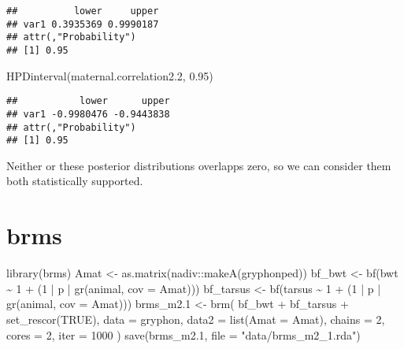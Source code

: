 \documentclass[
  12pt,
]{book}
\newenvironment{Shaded}{\begin{snugshade}}{\end{snugshade}}
\newcommand{\AttributeTok}[1]{\textcolor[rgb]{0.77,0.63,0.00}{#1}}
\newcommand{\ConstantTok}[1]{\textcolor[rgb]{0.00,0.00,0.00}{#1}}
\newcommand{\DecValTok}[1]{\textcolor[rgb]{0.00,0.00,0.81}{#1}}
\newcommand{\FloatTok}[1]{\textcolor[rgb]{0.00,0.00,0.81}{#1}}
\newcommand{\FunctionTok}[1]{\textcolor[rgb]{0.00,0.00,0.00}{#1}}
\newcommand{\NormalTok}[1]{#1}
\newcommand{\OtherTok}[1]{\textcolor[rgb]{0.56,0.35,0.01}{#1}}
\newcommand{\SpecialCharTok}[1]{\textcolor[rgb]{0.00,0.00,0.00}{#1}}
\newcommand{\StringTok}[1]{\textcolor[rgb]{0.31,0.60,0.02}{#1}}
\begin{document}
\begin{verbatim}
##          lower     upper
## var1 0.3935369 0.9990187
## attr(,"Probability")
## [1] 0.95
\end{verbatim}

\begin{Shaded}
\begin{Highlighting}[]
\FunctionTok{HPDinterval}\NormalTok{(maternal.correlation2}\FloatTok{.2}\NormalTok{, }\FloatTok{0.95}\NormalTok{)}
\end{Highlighting}
\end{Shaded}

\begin{verbatim}
##           lower      upper
## var1 -0.9980476 -0.9443838
## attr(,"Probability")
## [1] 0.95
\end{verbatim}

Neither or these posterior distributions overlapps zero, so we can consider them both statistically supported.

\hypertarget{brms-2}{%
\section{brms}\label{brms-2}}

\begin{Shaded}
\begin{Highlighting}[]
\FunctionTok{library}\NormalTok{(brms)}
\NormalTok{Amat }\OtherTok{\textless{}{-}} \FunctionTok{as.matrix}\NormalTok{(nadiv}\SpecialCharTok{::}\FunctionTok{makeA}\NormalTok{(gryphonped))}
\NormalTok{bf\_bwt }\OtherTok{\textless{}{-}} \FunctionTok{bf}\NormalTok{(bwt }\SpecialCharTok{\textasciitilde{}} \DecValTok{1} \SpecialCharTok{+}\NormalTok{ (}\DecValTok{1} \SpecialCharTok{|}\NormalTok{ p }\SpecialCharTok{|} \FunctionTok{gr}\NormalTok{(animal, }\AttributeTok{cov =}\NormalTok{ Amat)))}
\NormalTok{bf\_tarsus }\OtherTok{\textless{}{-}} \FunctionTok{bf}\NormalTok{(tarsus }\SpecialCharTok{\textasciitilde{}} \DecValTok{1} \SpecialCharTok{+}\NormalTok{ (}\DecValTok{1} \SpecialCharTok{|}\NormalTok{ p }\SpecialCharTok{|} \FunctionTok{gr}\NormalTok{(animal, }\AttributeTok{cov =}\NormalTok{ Amat)))}
\NormalTok{brms\_m2}\FloatTok{.1} \OtherTok{\textless{}{-}} \FunctionTok{brm}\NormalTok{(}
\NormalTok{  bf\_bwt }\SpecialCharTok{+}\NormalTok{ bf\_tarsus }\SpecialCharTok{+} \FunctionTok{set\_rescor}\NormalTok{(}\ConstantTok{TRUE}\NormalTok{),}
  \AttributeTok{data =}\NormalTok{ gryphon,}
  \AttributeTok{data2 =} \FunctionTok{list}\NormalTok{(}\AttributeTok{Amat =}\NormalTok{ Amat),}
  \AttributeTok{chains =} \DecValTok{2}\NormalTok{, }\AttributeTok{cores =} \DecValTok{2}\NormalTok{, }\AttributeTok{iter =} \DecValTok{1000}
\NormalTok{)}
\FunctionTok{save}\NormalTok{(brms\_m2}\FloatTok{.1}\NormalTok{, }\AttributeTok{file =} \StringTok{"data/brms\_m2\_1.rda"}\NormalTok{)}
\end{Highlighting}
\end{Shaded}
\end{document}
